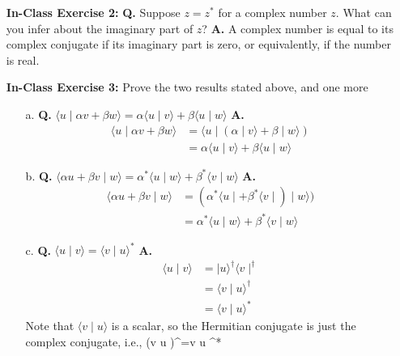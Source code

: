 \documentclass[main.tex]{subfiles}
\begin{document}
\begin{enumerate}
\item[] \textbf{In-Class Exercise 2:} \textbf{Q.} Suppose $z=z^{*}$ for a complex number $z$. What can you infer about the imaginary part of $z$? \textbf{A.} A complex number is equal to its complex conjugate if its imaginary part is zero, or equivalently, if the number is real. 

\item[] \textbf{In-Class Exercise 3:} Prove the two results stated above, and one more

    \begin{enumerate}
        \item[a.] \textbf{Q.} $\langle u \mid \alpha v+\beta w\rangle=\alpha\langle u \mid v\rangle+\beta\langle u \mid w\rangle$ \textbf{A.}
        \begin{align*}
            \langle u \mid \alpha v+\beta w\rangle &= \langle u \mid (\alpha \mid v \rangle + \beta \mid w\rangle)\\
            &=\alpha\langle u \mid v\rangle+\beta\langle u \mid w\rangle
        \end{align*}
        
        \item[b.] \textbf{Q.} $\langle\alpha u+\beta v \mid w\rangle=\alpha^{*}\langle u \mid w\rangle+\beta^{*}\langle v \mid w\rangle$ \textbf{A.}
        \begin{align*}
            \langle\alpha u+\beta v \mid w\rangle &= (\alpha^{*}\langle u \mid + \beta^{*} \langle v \mid) \mid w\rangle)\\
            &=\alpha^{*}\langle u \mid w\rangle+\beta^{*}\langle v \mid w\rangle
        \end{align*}
        
        \item[c.] \textbf{Q.} $\langle u \mid v\rangle=\langle v \mid u\rangle^{*}$ \textbf{A.}
        \begin{align*}
            \langle u \mid v \rangle & = \mid u \rangle^{\dagger}  \langle v \mid^{\dagger}\\
            &=\langle v \mid u\rangle^{\dagger}\\
            &=\langle v \mid u\rangle^{*}
        \end{align*}   
        Note that $\langle v \mid u \rangle$ is a scalar, so the Hermitian conjugate is just the complex conjugate, i.e., (\langle v \mid u \rangle)^{\dagger}=\langle v \mid u \rangle^{*}
        
    \end{enumerate}


\end{enumerate}
\end{document}
